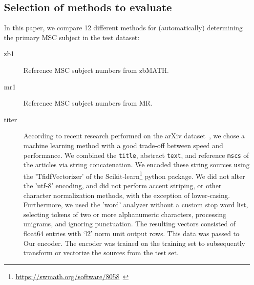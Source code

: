 \subsection{Selection of methods to evaluate}


In this paper, we compare 12 different methods for (automatically) determining the primary MSC subject in the test dataset:

\begin{description}
    \item[zb1] Reference MSC subject numbers from zbMATH.
  \item[mr1] Reference MSC subject numbers from MR.
  \item[titer]
  According to recent research performed on the arXiv dataset~\cite{Scharpf2020}, we chose a machine learning method with a good trade-off between speed and performance.
  We combined the \texttt{title}, abstract \texttt{text}, and reference \texttt{mscs} of the articles via string concatenation.
  We encoded these string sources using the 'TfidfVectorizer' of the Scikit-learn\footnote{\href{https://swmath.org/software/8058}{{https://swmath.org/software/8058}}~\cite{swSciKit}} python package.
  We did not alter the 'utf-8' encoding, and did not perform accent striping, or other character normalization methods, with the exception of lower-casing.
  Furthermore, we used the 'word' analyzer without a custom stop word list, selecting tokens of two or more alphanumeric characters, processing unigrams, and ignoring punctuation.
  The resulting vectors consisted of float64 entries with `l2' norm unit output rows.
  This data was passed to Our encoder.
  The encoder was trained on the training set to subsequently transform or vectorize the sources from the test set.

\end{description}
